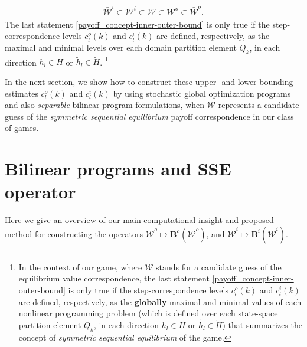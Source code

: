 \documentclass[a4paper,10pt,english]{sphinxmanual}
\begin{document}
\label{payoff_concept:equation-inner-outer-bound}\begin{gather}
\begin{split}        \bar{\mathcal{W}}^i \subset \mathcal{W}^i
        \subset \mathcal{W} \subset \mathcal{W}^o
        \subset \bar{\mathcal{W}}^o.\end{split}\label{payoff_concept-inner-outer-bound}
\end{gather}
The last statement \eqref{payoff_concept-inner-outer-bound} is only true if the step-correspondence levels $c_{l}^{o}(k)$ and $c_{l}^{i}(k)$ are defined, respectively, as the maximal and minimal levels over each domain partition element $Q_k$, in each direction $h_l \in H$ or $\tilde{h}_l \in \tilde{H}$. \footnote{
In the context of our game, where $\mathcal{W}$ stands for a candidate guess of the equilibrium value correspondence, the last statement \eqref{payoff_concept-inner-outer-bound} is only true if the step-correspondence levels $c_{l}^{o}(k)$ and $c_{l}^{i}(k)$ are defined, respectively, as the \textbf{globally} maximal and minimal values of each nonlinear programming problem (which is defined over each state-space partition element $Q_k$, in each direction $h_l \in H$ or $\tilde{h}_l \in \tilde{H}$) that summarizes the concept of \emph{symmetric sequential equilibrium} of the game.
}

In the next section, we show how to construct these upper- and lower
bounding estimates $c_{l}^{o}(k)$ and $c_{l}^{i}(k)$ by using
stochastic global optimization programs and also \emph{separable} bilinear program
formulations, when $\mathcal{W}$ represents a candidate guess of the
\emph{symmetric sequential equilibrium} payoff correspondence in our class of
games.


\chapter{Bilinear programs and SSE operator}
\label{payoff_bilinear::doc}\label{payoff_bilinear:bilinear-programs-and-sse-operator}
Here we give an overview of our main computational insight and proposed method for constructing the operators $\bar{\mathcal{W}}^o \mapsto \mathbf{B}^{o}(\bar{\mathcal{W}}^o)$, and $\bar{\mathcal{W}}^i \mapsto \mathbf{B}^{i}(\bar{\mathcal{W}}^i)$.
\end{document}
